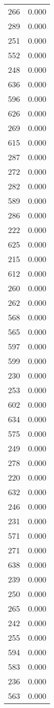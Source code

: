 \begin{table}
\begin{tabular}{lr}
266 & 0.000 \\
289 & 0.000 \\
251 & 0.000 \\
552 & 0.000 \\
248 & 0.000 \\
636 & 0.000 \\
596 & 0.000 \\
626 & 0.000 \\
269 & 0.000 \\
615 & 0.000 \\
287 & 0.000 \\
272 & 0.000 \\
282 & 0.000 \\
589 & 0.000 \\
286 & 0.000 \\
222 & 0.000 \\
625 & 0.000 \\
215 & 0.000 \\
612 & 0.000 \\
260 & 0.000 \\
262 & 0.000 \\
568 & 0.000 \\
565 & 0.000 \\
597 & 0.000 \\
599 & 0.000 \\
230 & 0.000 \\
253 & 0.000 \\
602 & 0.000 \\
634 & 0.000 \\
575 & 0.000 \\
249 & 0.000 \\
278 & 0.000 \\
220 & 0.000 \\
632 & 0.000 \\
246 & 0.000 \\
231 & 0.000 \\
571 & 0.000 \\
271 & 0.000 \\
638 & 0.000 \\
239 & 0.000 \\
250 & 0.000 \\
265 & 0.000 \\
242 & 0.000 \\
255 & 0.000 \\
594 & 0.000 \\
583 & 0.000 \\
236 & 0.000 \\
563 & 0.000 \\

\end{tabular}
\end{table}

